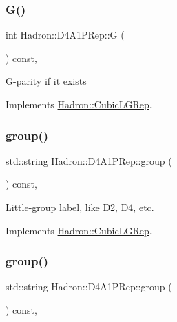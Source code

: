\subsubsection{\texorpdfstring{G()}{G()}\hspace{0.1cm}{\footnotesize\ttfamily [2/2]}}
{\footnotesize\ttfamily int Hadron\+::\+D4\+A1\+P\+Rep\+::G (\begin{DoxyParamCaption}{ }\end{DoxyParamCaption}) const\hspace{0.3cm}{\ttfamily [inline]}, {\ttfamily [virtual]}}

G-\/parity if it exists 

Implements \mbox{\hyperlink{structHadron_1_1CubicLGRep_ace26f7b2d55e3a668a14cb9026da5231}{Hadron\+::\+Cubic\+L\+G\+Rep}}.

\mbox{\label{structHadron_1_1D4A1PRep_aa8107b90fadc4874becba2ef3366e1b7}} 
\subsubsection{\texorpdfstring{group()}{group()}\hspace{0.1cm}{\footnotesize\ttfamily [1/2]}}
{\footnotesize\ttfamily std\+::string Hadron\+::\+D4\+A1\+P\+Rep\+::group (\begin{DoxyParamCaption}{ }\end{DoxyParamCaption}) const\hspace{0.3cm}{\ttfamily [inline]}, {\ttfamily [virtual]}}

Little-\/group label, like D2, D4, etc. 

Implements \mbox{\hyperlink{structHadron_1_1CubicLGRep_a9bdb14b519a611d21379ed96a3a9eb41}{Hadron\+::\+Cubic\+L\+G\+Rep}}.

\mbox{\label{structHadron_1_1D4A1PRep_aa8107b90fadc4874becba2ef3366e1b7}} 
\subsubsection{\texorpdfstring{group()}{group()}\hspace{0.1cm}{\footnotesize\ttfamily [2/2]}}
{\footnotesize\ttfamily std\+::string Hadron\+::\+D4\+A1\+P\+Rep\+::group (\begin{DoxyParamCaption}{ }\end{DoxyParamCaption}) const\hspace{0.3cm}{\ttfamily [inline]}, {\ttfamily [virtual]}}

